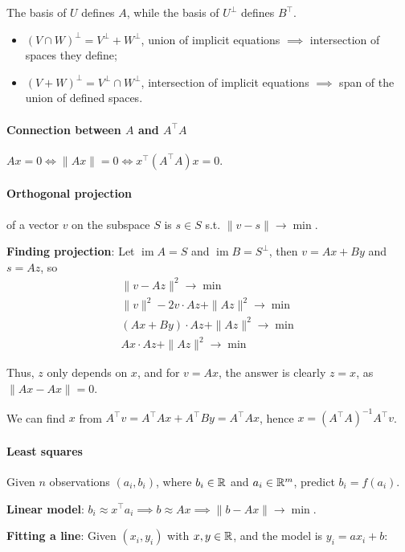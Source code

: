 \documentclass{article}
\begin{document}
The basis of $U$ defines $A$, while the basis of $U^\perp$ defines $B^\top$.

\begin{itemize}
    \item $(V \cap W)^\perp = V^\perp + W^\perp$, union of implicit equations $\implies$ intersection of spaces they define;
    \item $(V+W)^\perp = V^\perp \cap W^\perp$, intersection of implicit equations $\implies$ span of the union of defined spaces.
\end{itemize}

\paragraph{Connection between $A$ and $A^\top A$} $Ax = 0 \iff \|Ax\| = 0 \iff x^\top (A^\top A) x = 0$.

\paragraph{Orthogonal projection} of a vector $v$ on the subspace $S$ is $s \in S$ s.t. $\|v - s\| \to \min$.

\textbf{Finding projection}: Let $\operatorname{im} A = S$ and $\operatorname{im} B = S^\perp$, then $v = Ax + By$ and $s = Az$, so
\begin{gather*}
    \|v - Az\|^2 \to \min \\
    \|v\|^2 - 2 v \cdot Az + \|Az\|^2 \to \min \\
    (Ax+By) \cdot Az + \|Az\|^2 \to \min \\
    Ax \cdot Az + \|Az\|^2 \to \min
\end{gather*}

Thus, $z$ only depends on $x$, and for $v=Ax$, the answer is clearly $z=x$, as $\|Ax - Ax\| = 0$.

We can find $x$ from $A^\top v = A^\top A x + A^\top B y = A^\top A x$, hence $x = (A^\top A)^{-1} A^\top v$.

\paragraph{Least squares} Given $n$ observations $(a_i, b_i)$, where $b_i \in \mathbb{R}$ and $a_i \in \mathbb{R}^m$, predict $b_i = f(a_i)$.

\textbf{Linear model}: $b_i \approx x^\top a_i \implies b \approx Ax \implies \|b - Ax\| \to \min$.

\textbf{Fitting a line}: Given $(x_i, y_i)$ with $x, y \in \mathbb{R}$, and the model is $y_i = ax_i + b$:
\end{document}
